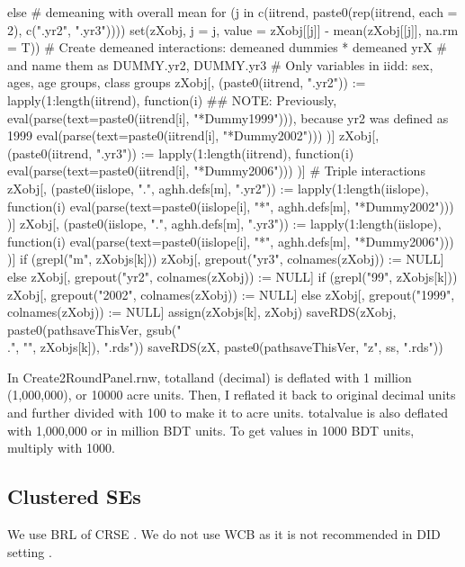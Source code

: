 \begin{Schunk}
\begin{Sinput}
{{{{{         }
      } else {
        # demeaning with overall mean
        for (j in c(iitrend, paste0(rep(iitrend, each = 2), c(".yr2", ".yr3"))))
          set(zXobj, j = j, value = zXobj[[j]] - mean(zXobj[[j]], na.rm = T))
      }
      # Create demeaned interactions: demeaned dummies * demeaned yrX
      # and name them as DUMMY.yr2, DUMMY.yr3
      # Only variables in iidd: sex, ages, age groups, class groups
      zXobj[, (paste0(iitrend, ".yr2")) := 
        lapply(1:length(iitrend), function(i) 
          ## NOTE: Previously, eval(parse(text=paste0(iitrend[i], "*Dummy1999"))), because yr2 was defined as 1999
          eval(parse(text=paste0(iitrend[i], "*Dummy2002")))
        )]
      zXobj[, (paste0(iitrend, ".yr3")) := 
        lapply(1:length(iitrend), function(i) 
          eval(parse(text=paste0(iitrend[i], "*Dummy2006")))
        )]
      # Triple interactions
      zXobj[, (paste0(iislope, ".", aghh.defs[m], ".yr2")) := 
        lapply(1:length(iislope), function(i) 
          eval(parse(text=paste0(iislope[i], "*", aghh.defs[m], "*Dummy2002")))
        )]
      zXobj[, (paste0(iislope, ".", aghh.defs[m], ".yr3")) := 
        lapply(1:length(iislope), function(i) 
          eval(parse(text=paste0(iislope[i], "*", aghh.defs[m], "*Dummy2006")))
        )]
    }
    if (grepl("m", zXobjs[k])) 
      zXobj[, grepout("yr3", colnames(zXobj)) := NULL] else
      zXobj[, grepout("yr2", colnames(zXobj)) := NULL]
    if (grepl("99", zXobjs[k])) 
      zXobj[, grepout("2002", colnames(zXobj)) := NULL] else
      zXobj[, grepout("1999", colnames(zXobj)) := NULL]
    assign(zXobjs[k], zXobj)
    saveRDS(zXobj, paste0(pathsaveThisVer, gsub("\\.", "", zXobjs[k]), ".rds"))
  }
  saveRDS(zX, paste0(pathsaveThisVer, "z", ss, ".rds"))
}
\end{Sinput}
\end{Schunk}
In \textsf{Create2RoundPanel.rnw}, \textsf{totalland} (decimal) is deflated with 1 million (1,000,000), or 10000 acre units. Then, I reflated it back to original decimal units and further divided with 100 to make it to acre units. \textsf{totalvalue} is also deflated with 1,000,000 or in million BDT units. To get values in 1000 BDT units, multiply with 1000. 

\subsection{Clustered SEs}

We use BRL of CRSE \citep{BellMcCaffrey2002, ImbensKolesar2016, PustejovskyTipton2018}. We do not use WCB as it is not recommended in DID setting \citep{CanaySantosShaikh2021}.




